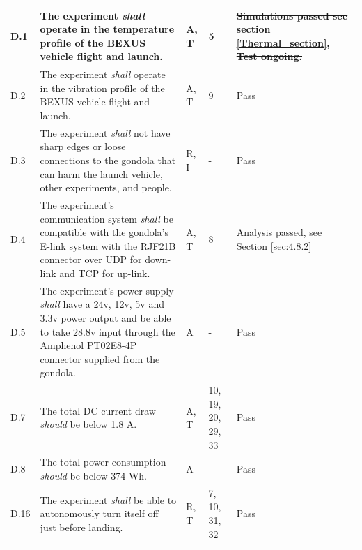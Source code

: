 \documentclass[a4paper,12pt,oneside]{article}
\providecommand{\DIFaddtex}[1]{{\protect\color{blue}\uwave{#1}}} %
\providecommand{\DIFdeltex}[1]{{\protect\color{red}\sout{#1}}}                      %
\providecommand{\DIFaddbegin}{} %
\providecommand{\DIFaddend}{} %
\providecommand{\DIFdelbegin}{} %
\providecommand{\DIFdelend}{} %
\providecommand{\DIFadd}[1]{\texorpdfstring{\DIFaddtex{#1}}{#1}} %
\providecommand{\DIFdel}[1]{\texorpdfstring{\DIFdeltex{#1}}{}} %
\newcommand{\DIFscaledelfig}{0.5}
\newlength{\DIFdelgraphicswidth} %
\newlength{\DIFdelgraphicsheight} %
\newcommand{\DIFaddincludegraphics}[2][]{{\color{blue}\fbox{\DIFOincludegraphics[#1]{#2}}}} %
\newcommand{\DIFdelincludegraphics}[2][]{%
\sbox{\DIFdelgraphicsbox}{\DIFOincludegraphics[#1]{#2}}%
\settoboxwidth{\DIFdelgraphicswidth}{\DIFdelgraphicsbox} %
\settoboxtotalheight{\DIFdelgraphicsheight}{\DIFdelgraphicsbox} %
\scalebox{\DIFscaledelfig}{%
\parbox[b]{\DIFdelgraphicswidth}{\usebox{\DIFdelgraphicsbox}\\[-\baselineskip] \rule{\DIFdelgraphicswidth}{0em}}\llap{\resizebox{\DIFdelgraphicswidth}{\DIFdelgraphicsheight}{%
\setlength{\unitlength}{\DIFdelgraphicswidth}%
\begin{picture}(1,1)%
\thicklines\linethickness{2pt} %
{\color[rgb]{1,0,0}\put(0,0){\framebox(1,1){}}}%
{\color[rgb]{1,0,0}\put(0,0){\line( 1,1){1}}}%
{\color[rgb]{1,0,0}\put(0,1){\line(1,-1){1}}}%
\end{picture}%
}\hspace*{3pt}}} %
} %
\DeclareRobustCommand{\DIFaddbegin}{\DIFOaddbegin \let\includegraphics\DIFaddincludegraphics} %
\DeclareRobustCommand{\DIFaddend}{\DIFOaddend \let\includegraphics\DIFOincludegraphics} %
\DeclareRobustCommand{\DIFdelbegin}{\DIFOdelbegin \let\includegraphics\DIFdelincludegraphics} %
\DeclareRobustCommand{\DIFdelend}{\DIFOaddend \let\includegraphics\DIFOincludegraphics} %
\begin{document}
\begin{longtable}[]{|m{}| m{} |m{} |m{}|m{}|}
D.1  & The experiment \textit{shall} operate in the temperature profile of the BEXUS vehicle flight and launch.\cite{BexusManual}                                                                         &       A, T       & 5            & \DIFdelbegin \DIFdel{Simulations passed see section \ref{Thermal_section}, Test ongoing.     }\DIFdelend \DIFaddbegin \DIFadd{Pass     }\DIFaddend \\ \hline
D.2  & The experiment \textit{shall} operate in the vibration profile of the BEXUS vehicle flight and launch.\cite{BexusManual}                                                                          &       A, T       & 9            &  Pass \\ \hline %
D.3  & The experiment \textit{shall} not have sharp edges or loose connections to the gondola that can harm the launch vehicle, other experiments, and people.                                                                                                           &      R, I      & -          &   Pass     \\ \hline %
D.4  & The experiment's communication system \textit{shall} be compatible with the gondola's E-link system with the RJF21B connector over UDP for down-link and TCP for up-link.                                                                             &      A, T        & 8            &    \DIFdelbegin \DIFdel{Analysis passed, see Section \ref{sec:4.8.2}    }\DIFdelend \DIFaddbegin \DIFadd{Pass }\DIFaddend \\  \hline%
D.5  & The experiment's power supply \textit{shall} have a 24v, 12v, 5v and 3.3v power output and be able to take 28.8v input through the Amphenol PT02E8-4P connector supplied from the gondola.                                                                                    &      A       &  -           & Pass      \\ \hline %
D.7  & The total DC current draw \textit{should} be below 1.8 A. &      A, T        & 10, 19, 20, 29, 33            & Pass        \\ \hline
D.8  & The total power consumption \textit{should} be below 374 Wh.& A & - & Pass \\ \hline %
D.16 & The experiment \textit{shall} be able to autonomously turn itself off just before landing.                                                                                       &       R, T      &  7, 10, 31, 32           &   Pass    \\ \hline

\end{longtable}
\end{document}
